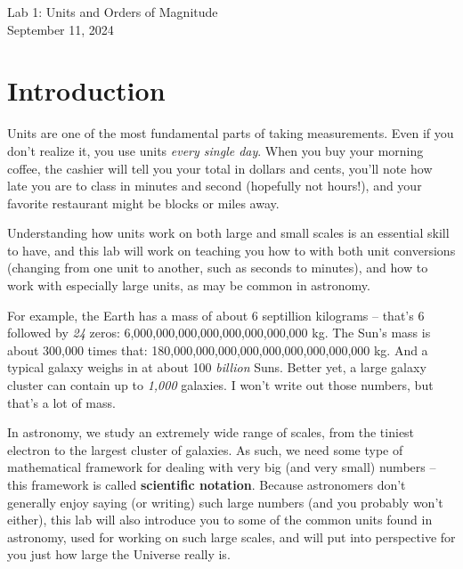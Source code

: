 \documentclass[11pt]{article}
\begin{document}
\begin{center}
\huge{Lab 1: Units and Orders of Magnitude}\\ \medskip \Large{September 11, 2024}
\end{center}


\section{Introduction}

Units are one of the most fundamental parts of taking measurements. Even if you don't realize it, you use units \emph{every single day}. When you buy your morning coffee, the cashier will tell you your total in dollars and cents, you'll note how late you are to class in minutes and second (hopefully not hours!), and your favorite restaurant might be blocks or miles away. 

Understanding how units work on both large and small scales is an essential skill to have, and this lab will work on teaching you how to with both unit conversions (changing from one unit to another, such as seconds to minutes), and how to work with especially large units, as may be common in astronomy.

For example, the Earth has a mass of about 6 septillion kilograms -- that's 6 followed by \emph{24} zeros: 6,000,000,000,000,000,000,000,000 kg. The Sun's mass is about 300,000 times that: 180,000,000,000,000,000,000,000,000,000 kg. And a typical galaxy weighs in at about 100 \emph{billion} Suns. Better yet, a large galaxy cluster can contain up to \emph{1,000} galaxies. I won't write out those numbers, but that's a lot of mass.

In astronomy, we study an extremely wide range of scales, from the tiniest electron to the largest cluster of galaxies. As such, we need some type of mathematical framework for dealing with very big (and very small) numbers -- this framework is called \textbf{scientific notation}. Because astronomers don't generally enjoy saying (or writing) such large numbers (and you probably won't either), this lab will also introduce you to some of the common units found in astronomy, used for working on such large scales, and will put into perspective for you just how large the Universe really is.

\bigskip
\end{document}

